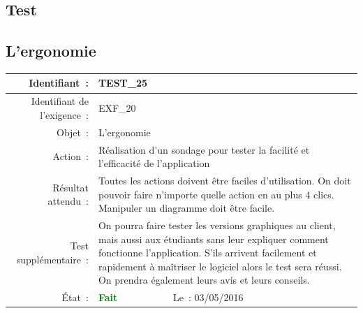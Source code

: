 \documentclass[hidelinks, a4paper,11pt,twoside,final]{article}
\begin{document}
\subsection*{Test}
  \subsection*{L’ergonomie}
    \begin{tabular}{|r|p{5cm}|p{5cm}|}\hline
    {Identifiant~:} & \multicolumn{2}{|p{10cm}|}{TEST\_25} \\\hline
      {Identifiant de l’exigence~:} & \multicolumn{2}{|p{10cm}|}{EXF\_20} \\\hline
        {Objet~:} & \multicolumn{2}{|p{10cm}|}{L’ergonomie} \\\hline
        {Action~:} & \multicolumn{2}{|p{10cm}|}{Réalisation d'un sondage pour tester la facilité et l'efficacité de l'application} \\\hline
        {Résultat attendu~:} & \multicolumn{2}{|p{10cm}|}{Toutes les actions doivent être faciles d’utilisation.
                              On doit pouvoir faire n’importe quelle action en au plus 4 clics.
                              Manipuler un diagramme doit être facile.} \\\hline
    {Test supplémentaire~:} & \multicolumn{2}{|p{10cm}|}{On pourra faire tester les versions graphiques au client, mais aussi aux étudiants
                                sans leur expliquer comment fonctionne l’application. S’ils arrivent facilement et rapidement
                                à maîtriser le logiciel alors le test sera réussi. On prendra également leurs avis et leurs conseils.} \\\hline
        {État~:} & {\textcolor{green}{\textbf{Fait}}} & {Le~: 03/05/2016 } \\\hline
    \end{tabular}
    \\
    \newline
\end{document}
